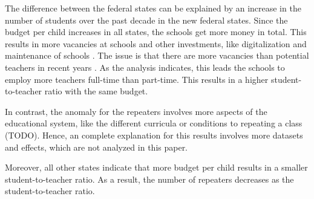 The difference between the federal states can be explained by an increase in the number of students over the past decade in the new federal states. Since the budget per child  increases in all states, the schools get more money in total. This results in more vacancies at schools \cite{kultusminister_konferenz_lehrkrafteeinstellungsbedarf_2023} and other investments, like digitalization and maintenance of schools \cite{bundesministerium_fur_bildung_und_forschung_fortschrittsbericht_2022}. The issue is that there are more vacancies than potential teachers in recent years \cite{kultusminister_konferenz_lehrkrafteeinstellungsbedarf_2023}. As the analysis indicates, this leads the schools to employ more teachers full-time than part-time. This results in a higher student-to-teacher ratio with the same budget.

In contrast, the anomaly for the repeaters involves more aspects of the educational system, like the different curricula or conditions to repeating a class (TODO). Hence, an complete explanation for this results involves more datasets and effects, which are not analyzed in this paper.

Moreover, all other states indicate that more budget per child results in a smaller student-to-teacher ratio. As a result, the number of repeaters decreases as the student-to-teacher ratio.